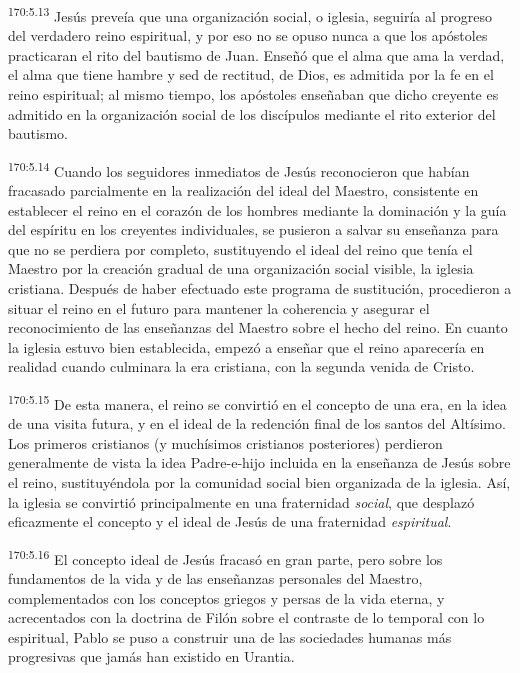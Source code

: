 \par 
\textsuperscript{170:5.13} Jesús preveía que una organización social, o iglesia, seguiría al progreso del verdadero reino espiritual, y por eso no se opuso nunca a que los apóstoles practicaran el rito del bautismo de Juan. Enseñó que el alma que ama la verdad, el alma que tiene hambre y sed de rectitud, de Dios, es admitida por la fe en el reino espiritual; al mismo tiempo, los apóstoles enseñaban que dicho creyente es admitido en la organización social de los discípulos mediante el rito exterior del bautismo.

\par 
\textsuperscript{170:5.14} Cuando los seguidores inmediatos de Jesús reconocieron que habían fracasado parcialmente en la realización del ideal del Maestro, consistente en establecer el reino en el corazón de los hombres mediante la dominación y la guía del espíritu en los creyentes individuales, se pusieron a salvar su enseñanza para que no se perdiera por completo, sustituyendo el ideal del reino que tenía el Maestro por la creación gradual de una organización social visible, la iglesia cristiana. Después de haber efectuado este programa de sustitución, procedieron a situar el reino en el futuro para mantener la coherencia y asegurar el reconocimiento de las enseñanzas del Maestro sobre el hecho del reino. En cuanto la iglesia estuvo bien establecida, empezó a enseñar que el reino aparecería en realidad cuando culminara la era cristiana, con la segunda venida de Cristo.

\par 
\textsuperscript{170:5.15} De esta manera, el reino se convirtió en el concepto de una era, en la idea de una visita futura, y en el ideal de la redención final de los santos del Altísimo. Los primeros cristianos (y muchísimos cristianos posteriores) perdieron generalmente de vista la idea Padre-e-hijo incluida en la enseñanza de Jesús sobre el reino, sustituyéndola por la comunidad social bien organizada de la iglesia. Así, la iglesia se convirtió principalmente en una fraternidad \textit{social}, que desplazó eficazmente el concepto y el ideal de Jesús de una fraternidad \textit{espiritual}.

\par 
\textsuperscript{170:5.16} El concepto ideal de Jesús fracasó en gran parte, pero sobre los fundamentos de la vida y de las enseñanzas personales del Maestro, complementados con los conceptos griegos y persas de la vida eterna, y acrecentados con la doctrina de Filón sobre el contraste de lo temporal con lo espiritual, Pablo se puso a construir una de las sociedades humanas más progresivas que jamás han existido en Urantia.

